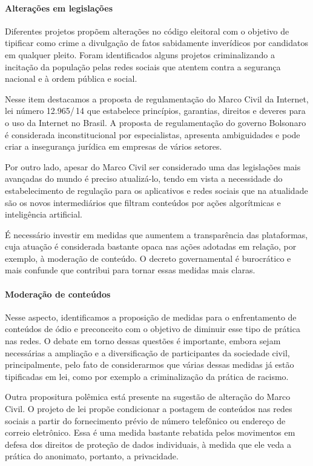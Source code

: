 \paragraph{Alterações em legislações} Diferentes projetos propõem alterações no código eleitoral com o objetivo de tipificar como crime a divulgação de fatos sabidamente inverídicos por candidatos em qualquer pleito. Foram identificados alguns projetos criminalizando a incitação da população pelas redes sociais que atentem contra a segurança nacional e à ordem pública e social.

Nesse item destacamos a proposta de regulamentação do Marco Civil da Internet, lei número 12.965/\,14 que estabelece princípios, garantias, direitos e deveres para o uso da Internet no Brasil. A proposta de regulamentação do governo Bolsonaro é considerada inconstitucional por especialistas, apresenta ambiguidades e pode criar a insegurança jurídica em empresas de vários setores.

Por outro lado, apesar do Marco Civil ser considerado uma das legislações mais avançadas do mundo é preciso atualizá-lo, tendo em vista a necessidade do estabelecimento de regulação para os aplicativos e redes sociais que na atualidade são os novos intermediários que filtram conteúdos por ações algorítmicas e inteligência artificial.

É necessário investir em medidas que aumentem a transparência das plataformas, cuja atuação é considerada bastante opaca nas ações adotadas em relação, por exemplo, à moderação de conteúdo. O decreto governamental é burocrático e mais confunde que contribui para tornar essas medidas mais claras.

\paragraph{Moderação de conteúdos} Nesse aspecto, identificamos a proposição de medidas para o enfrentamento de conteúdos de ódio e preconceito com o objetivo de diminuir esse tipo de prática nas redes. O debate em torno dessas questões é importante, embora sejam necessárias a ampliação e a diversificação de participantes da sociedade civil, principalmente, pelo fato de considerarmos que várias dessas medidas já estão tipificadas em lei, como por exemplo a
criminalização da prática de racismo.

Outra propositura polêmica está presente na sugestão de alteração do Marco Civil. O projeto de lei propõe condicionar a postagem de conteúdos nas redes sociais a partir do fornecimento prévio de número telefônico ou endereço de correio eletrônico. Essa é uma medida bastante rebatida pelos movimentos em defesa dos direitos de proteção de dados individuais, à medida que ele veda a prática do anonimato, portanto, a privacidade.

